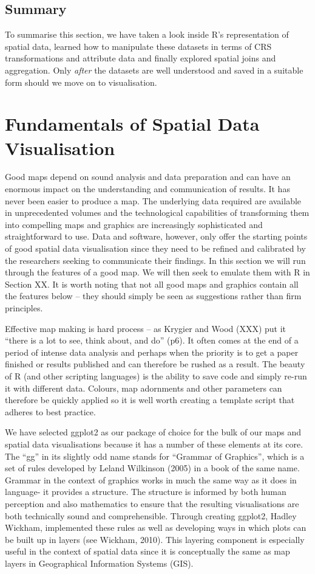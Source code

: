 \documentclass[]{article}
\begin{document}
\subsection{Summary}

To summarise this section, we have taken a look inside R's
representation of spatial data, learned how to manipulate these datasets
in terms of CRS transformations and attribute data and finally explored
spatial joins and aggregation. Only \emph{after} the datasets are well
understood and saved in a suitable form should we move on to
visualisation.

\section{Fundamentals of Spatial Data Visualisation}

Good maps depend on sound analysis and data preparation and can have an
enormous impact on the understanding and communication of results. It
has never been easier to produce a map. The underlying data required are
available in unprecedented volumes and the technological capabilities of
transforming them into compelling maps and graphics are increasingly
sophisticated and straightforward to use. Data and software, however,
only offer the starting points of good spatial data visualisation since
they need to be refined and calibrated by the researchers seeking to
communicate their findings. In this section we will run through the
features of a good map. We will then seek to emulate them with R in
Section XX. It is worth noting that not all good maps and graphics
contain all the features below -- they should simply be seen as
suggestions rather than firm principles.

Effective map making is hard process -- as Krygier and Wood (XXX) put it
``there is a lot to see, think about, and do'' (p6). It often comes at
the end of a period of intense data analysis and perhaps when the
priority is to get a paper finished or results published and can
therefore be rushed as a result. The beauty of R (and other scripting
languages) is the ability to save code and simply re-run it with
different data. Colours, map adornments and other parameters can
therefore be quickly applied so it is well worth creating a template
script that adheres to best practice.

We have selected ggplot2 as our package of choice for the bulk of our
maps and spatial data visualisations because it has a number of these
elements at its core. The ``gg'' in its slightly odd name stands for
``Grammar of Graphics'', which is a set of rules developed by Leland
Wilkinson (2005) in a book of the same name. Grammar in the context of
graphics works in much the same way as it does in language- it provides
a structure. The structure is informed by both human perception and also
mathematics to ensure that the resulting visualisations are both
technically sound and comprehensible. Through creating ggplot2, Hadley
Wickham, implemented these rules as well as developing ways in which
plots can be built up in layers (see Wickham, 2010). This layering
component is especially useful in the context of spatial data since it
is conceptually the same as map layers in Geographical Information
Systems (GIS).
\end{document}
